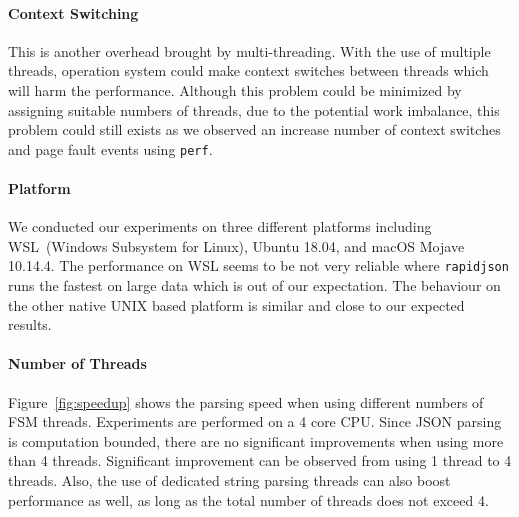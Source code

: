 \documentclass[11pt]{article}
\begin{document}
\paragraph{Context Switching} This is another overhead brought by multi-threading. With the use of multiple threads, operation system could make context switches between threads which will harm the performance. Although this problem could be minimized by assigning suitable numbers of threads, due to the potential work imbalance, this problem could still exists as we observed an increase number of context switches and page fault events using \texttt{perf}.

\paragraph{Platform} We conducted our experiments on three different platforms including WSL~(Windows Subsystem for Linux), Ubuntu 18.04, and macOS Mojave 10.14.4. The performance on WSL seems to be not very reliable where \texttt{rapidjson} runs the fastest on large data which is out of our expectation. The behaviour on the other native UNIX based platform is similar and close to our expected results.

\paragraph{Number of Threads} Figure~\ref{fig:speedup} shows the parsing speed when using different numbers of FSM threads. Experiments are performed on a 4 core CPU. Since JSON parsing is computation bounded, there are no significant improvements when using more than 4 threads. Significant improvement can be observed from using 1 thread to 4 threads. Also, the use of dedicated string parsing threads can also boost performance as well, as long as the total number of threads does not exceed 4.
\end{document}
